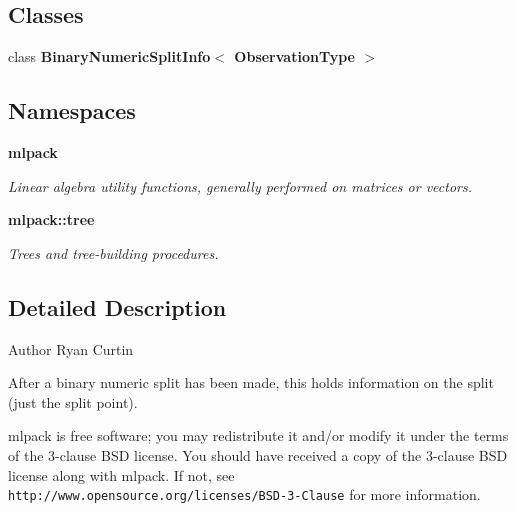 \subsection*{Classes}
\begin{DoxyCompactItemize}
\item 
class \textbf{ Binary\+Numeric\+Split\+Info$<$ Observation\+Type $>$}
\end{DoxyCompactItemize}
\subsection*{Namespaces}
\begin{DoxyCompactItemize}
\item 
 \textbf{ mlpack}
\begin{DoxyCompactList}\small\item\em Linear algebra utility functions, generally performed on matrices or vectors. \end{DoxyCompactList}\item 
 \textbf{ mlpack\+::tree}
\begin{DoxyCompactList}\small\item\em Trees and tree-\/building procedures. \end{DoxyCompactList}\end{DoxyCompactItemize}


\subsection{Detailed Description}
\begin{DoxyAuthor}{Author}
Ryan Curtin
\end{DoxyAuthor}
After a binary numeric split has been made, this holds information on the split (just the split point).

mlpack is free software; you may redistribute it and/or modify it under the terms of the 3-\/clause B\+SD license. You should have received a copy of the 3-\/clause B\+SD license along with mlpack. If not, see {\tt http\+://www.\+opensource.\+org/licenses/\+B\+S\+D-\/3-\/\+Clause} for more information. 